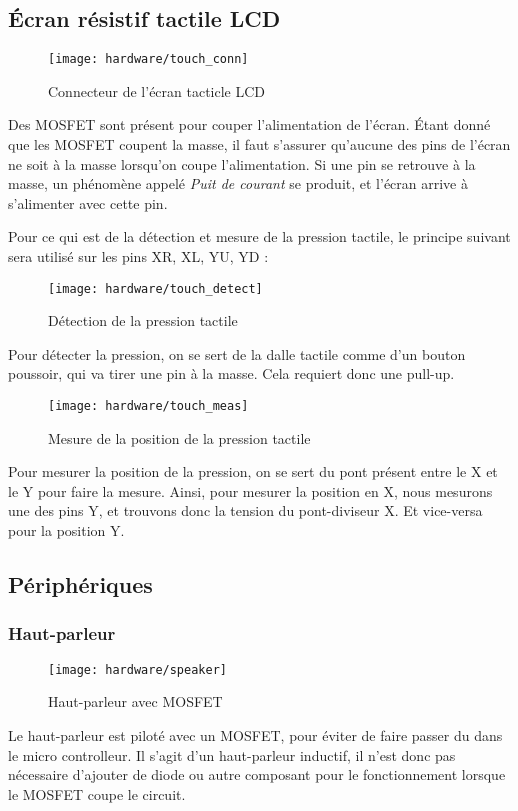 \subsection{Écran résistif tactile LCD}
\begin{figure}[H]
  \centering
  \texttt{[image: hardware/touch\_conn]}
  \caption{Connecteur de l'écran tacticle LCD}
  \label{hard_lcd}
\end{figure}
Des MOSFET sont présent pour couper l'alimentation de l'écran.
Étant donné que les MOSFET coupent la masse, il faut s'assurer qu'aucune
des pins de l'écran ne soit à la masse lorsqu'on coupe l'alimentation.
Si une pin se retrouve à la masse, un phénomène appelé \emph{Puit de courant}
se produit, et l'écran arrive à s'alimenter avec cette pin.

Pour ce qui est de la détection et mesure de la pression tactile, le principe
suivant sera utilisé sur les pins XR, XL, YU, YD :
\begin{figure}[H]
  \centering
  \texttt{[image: hardware/touch\_detect]}
  \caption{Détection de la pression tactile}
  \label{hard_touchDetect}
\end{figure}
Pour détecter la pression, on se sert de la dalle tactile comme d'un bouton
poussoir, qui va tirer une pin à la masse. Cela requiert donc une pull-up.

\begin{figure}[H]
  \centering
  \texttt{[image: hardware/touch\_meas]}
  \caption{Mesure de la position de la pression tactile}
  \label{hard_touchMeas}
\end{figure}
Pour mesurer la position de la pression, on se sert du pont présent entre
le X et le Y pour faire la mesure. Ainsi, pour mesurer la position en X, nous
mesurons une des pins Y, et trouvons donc la tension du pont-diviseur X.
Et vice-versa pour la position Y.

\subsection{Périphériques}
\subsubsection{Haut-parleur}
\begin{figure}[H]
  \centering
  \texttt{[image: hardware/speaker]}
  \caption{Haut-parleur avec MOSFET}
  \label{hard_speaker}
\end{figure}
Le haut-parleur est piloté avec un MOSFET, pour éviter de faire passer du
dans le micro controlleur. Il s'agit d'un haut-parleur inductif, il n'est
donc pas nécessaire d'ajouter de diode ou autre composant pour le fonctionnement
lorsque le MOSFET coupe le circuit.

